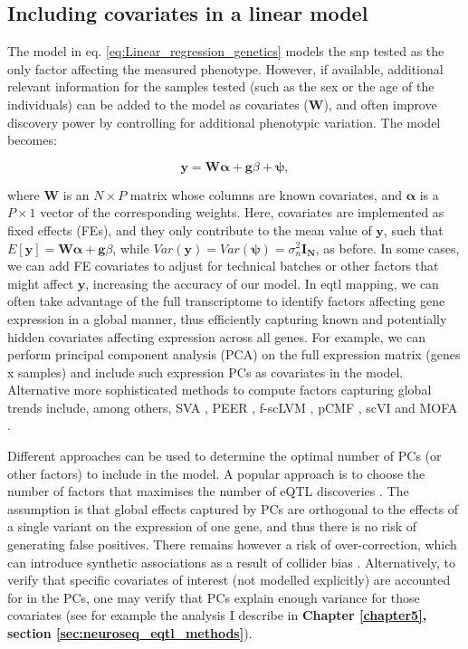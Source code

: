 \subsection{Including covariates in a linear model}
\label{sec:confounders}

The model in eq. \eqref{eq:Linear_regression_genetics} models the \gls{snp} tested as the only factor affecting the measured phenotype.
However, if available, additional relevant information for the samples tested (such as the sex or the age of the individuals) can be added to the model as covariates ($\mathbf{W}$), and often improve discovery power by controlling for additional phenotypic variation. 
The model becomes:

\begin{equation}\label{eq:Linear_regression_genetics_covariates}
 \mathbf{y} =  \mathbf{W}\boldsymbol{\alpha} + \mathbf{g}\beta + \boldsymbol{\psi}, 
\end{equation}

where $\mathbf{W}$ is an $N \times P$ matrix whose columns are known covariates, and $\boldsymbol{\alpha}$ is a $P \times 1$ vector of the corresponding weights.
Here, covariates are implemented as fixed effects (FEs), and they only contribute to the mean value of $\mathbf{y}$, such that $E[\mathbf{y}] = \mathbf{W}\boldsymbol{\alpha} + \mathbf{g}\beta$, while $Var(\mathbf{y}) = Var(\boldsymbol{\psi}) = \sigma_n^2 \mathbf{I_N} $, as before.
In some cases, we can add FE covariates to adjust for technical batches or other factors that might 
affect $\mathbf{y}$, increasing the accuracy of our model.
In \gls{eqtl} mapping, we can often take advantage of the full transcriptome to identify factors affecting gene expression in a global manner, thus efficiently capturing known and potentially hidden covariates affecting expression across all genes.
For example, we can perform principal component analysis (PCA) on the full expression matrix (genes x samples) and include such expression PCs as covariates in the model.
Alternative more sophisticated methods to compute factors capturing global trends include, among others, SVA \cite{leek2007capturing}, PEER \cite{stegle2010bayesian, stegle2012using}, f-scLVM \cite{buettner2017f}, pCMF \cite{durif2019probabilistic}, scVI \cite{lopez2018deep, svensson2020interpretable} and MOFA \cite{argelaguet2018multi}. 

Different approaches can be used to determine the optimal number of PCs (or other factors) to include in the model.
A popular approach is to choose the number of factors that maximises the number of eQTL discoveries \cite{westra2014genome, gtex2017genetic, aguet2019gtex}.
The assumption is that global effects captured by PCs are orthogonal to the effects of a single variant on the expression of one gene, and thus there is no risk of generating false positives. 
There remains however a risk of over-correction, which can introduce synthetic associations as a result of collider bias \cite{aschard2017covariate}.
Alternatively, to verify that specific covariates of interest (not modelled explicitly) are accounted for in the PCs, one may verify that PCs explain enough variance for those covariates (see for example the analysis I describe in \textbf{Chapter \ref{chapter5}, section \ref{sec:neuroseq_eqtl_methods}}).


